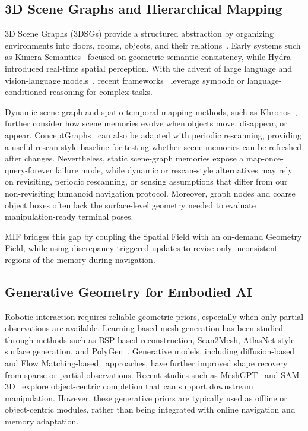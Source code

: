 \documentclass[conference]{IEEEtran}
\begin{document}
\subsection{3D Scene Graphs and Hierarchical Mapping}
%
3D Scene Graphs (3DSGs) provide a structured abstraction by organizing environments into floors, rooms, objects, and their relations~\cite{armeni20193d, Werby-RSS-24, wu2021scenegraphfusion, wald2020learning, bavle2022situational}.
%
Early systems such as Kimera-Semantics~\cite{rosinol20203d} focused on geometric-semantic consistency, while Hydra~\cite{hughes2022hydra} introduced real-time spatial perception.
%
With the advent of large language and vision-language models~\cite{hurst2024gpt}, recent frameworks~\cite{pmlr-v270-xu25b, Werby-RSS-24, rana2023sayplan, chalvatzaki2023learning, ni2024grid, yin2024sg} leverage symbolic or language-conditioned reasoning for complex tasks.

%
Dynamic scene-graph and spatio-temporal mapping methods, such as Khronos~\cite{schmid2024khronos}, further consider how scene memories evolve when objects move, disappear, or appear.
%
ConceptGraphs~\cite{gu2024conceptgraphs} can also be adapted with periodic rescanning, providing a useful rescan-style baseline for testing whether scene memories can be refreshed after changes.
%
Nevertheless, static scene-graph memories expose a map-once-query-forever failure mode, while dynamic or rescan-style alternatives may rely on revisiting, periodic rescanning, or sensing assumptions that differ from our non-revisiting humanoid navigation protocol.
%
Moreover, graph nodes and coarse object boxes often lack the surface-level geometry needed to evaluate manipulation-ready terminal poses.

%
MIF bridges this gap by coupling the Spatial Field with an on-demand Geometry Field, while using discrepancy-triggered updates to revise only inconsistent regions of the memory during navigation.
%


\subsection{Generative Geometry for Embodied AI}
%
Robotic interaction requires reliable geometric priors, especially when only partial observations are available.
%
Learning-based mesh generation has been studied through methods such as BSP-based reconstruction, Scan2Mesh, AtlasNet-style surface generation, and PolyGen~\cite{chen2020bsp, dai2019scan2mesh, groueix2018papier, nash2020polygen}.
%
Generative models, including diffusion-based~\cite{ho2020denoising} and Flow Matching-based~\cite{lipman2023flow} approaches, have further improved shape recovery from sparse or partial observations.
%
Recent studies such as MeshGPT~\cite{siddiqui2024meshgpt} and SAM-3D~\cite{chen2025sam} explore object-centric completion that can support downstream manipulation.
%
However, these generative priors are typically used as offline or object-centric modules, rather than being integrated with online navigation and memory adaptation.
\end{document}
